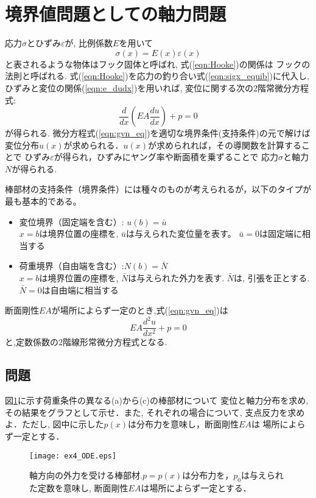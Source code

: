 \documentclass[10pt,a4j]{jbook}
\begin{document}
\section{境界値問題としての軸力問題}
応力$\sigma$とひずみ$\varepsilon$が, 比例係数$E$を用いて
\begin{equation}
	\sigma(x) =E(x) \varepsilon (x)
	\label{eqn:Hooke}
\end{equation}
と表されるような物体はフック固体と呼ばれ, 式(\ref{eqn:Hooke})の関係は
フックの法則と呼ばれる. 式(\ref{eqn:Hooke})を応力の釣り合い式(\ref{eqn:sigx_equib})に代入し, 
ひずみと変位の関係(\ref{eqn:e_dudx})を用いれば, 
変位に関する次の2階常微分方程式:
\begin{equation}
	\frac{d}{dx}\left( EA \frac{du}{dx} \right)+p=0
	\label{eqn:gvn_eq}
\end{equation}
が得られる. 微分方程式(\ref{eqn:gvn_eq})を適切な境界条件(支持条件)の元で解けば
変位分布$u(x)$が求められる．$u(x)$が求められれば，その導関数を計算することで
ひずみ$\varepsilon$が得られ，ひずみにヤング率や断面積を乗ずることで
応力$\sigma$と軸力$N$が得られる.

棒部材の支持条件（境界条件）には種々のものが考えられるが，以下のタイプが最も基本的である。
\begin{itemize}
\item
変位境界（固定端を含む）: $u(b)=\bar{u}$\\
	$x=b$は境界位置の座標を, $\bar u$は与えられた変位量を表す。
	$\bar u=0$は固定端に相当する
\item
荷重境界（自由端を含む）:$N(b)=\bar{N}$\\
	 $x=b$は境界位置の座標を, $\bar N$は与えられた外力を表す.
	$\bar{N}$は, 引張を正とする. $\bar N=0$は自由端に相当する
\end{itemize}
断面剛性$EA$が場所によらず一定のとき,式(\ref{eqn:gvn_eq})は
\begin{equation}
	EA\frac{d^2u}{dx^2}+p=0
	\label{eqn:gvn_eq2}
\end{equation}
と,定数係数の2階線形常微分方程式となる.
\subsection{問題}
図\ref{fig:fig4}に示す荷重条件の異なる(a)から(c)の棒部材について
変位と軸力分布を求め, その結果をグラフとして示せ．また, それぞれの場合について, 
支点反力を求めよ．ただし, 図中に示した$p(x)$は分布力を意味し，断面剛性$EA$は
場所によらず一定とする．
\begin{figure}[h]
	\begin{center}
	\texttt{[image: ex4\_ODE.eps]} 
	\end{center}
	\caption{軸方向の外力を受ける棒部材.$p=p(x)$は分布力を，$p_0$は与えられた定数を意味し, 
	断面剛性$EA$は場所によらず一定とする．} 
	\label{fig:fig4}
\end{figure}
\clearpage
\end{document}
